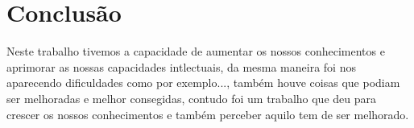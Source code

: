 \documentclass{llncs}
\begin{document}

\section{Conclusão}
Neste trabalho tivemos a capacidade de aumentar os nossos conhecimentos e aprimorar as nossas capacidades intlectuais, da mesma maneira foi nos 
aparecendo dificuldades como por exemplo..., também houve coisas que podiam ser melhoradas e melhor consegidas, contudo foi um trabalho que deu para crescer os nossos conhecimentos e também perceber aquilo tem de ser melhorado.

%


\end{document}
